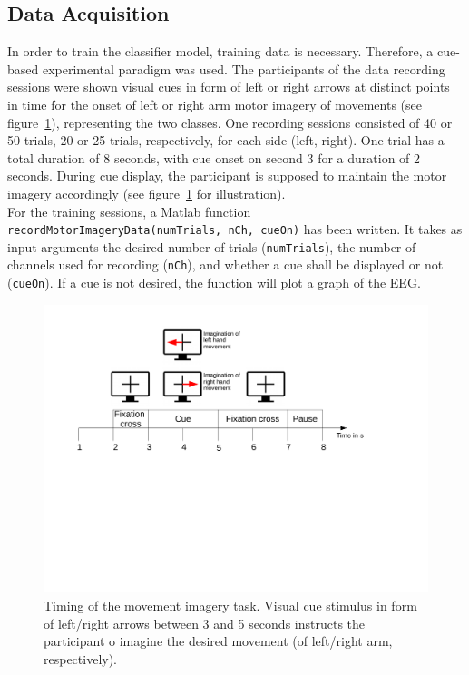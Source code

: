 \documentclass[a4paper,twoside, openright,12pt]{report}
\begin{document}
\subsection{Data Acquisition}
In order to train the classifier model, training data is necessary. Therefore, a cue-based experimental paradigm was used. The participants of the data recording sessions were shown visual cues in form of left or right arrows at distinct points in time for the onset of left or right arm motor imagery of movements (see figure~\ref{fig:exp_design}), representing the two classes. One recording sessions consisted of 40 or 50 trials, 20 or 25 trials, respectively, for each side (left, right). One trial has a total duration of 8 seconds, with cue onset on second 3 for a duration of 2 seconds. During cue display, the participant is supposed to maintain the motor imagery accordingly (see figure~\ref{fig:exp_design} for illustration).\\
For the training sessions, a Matlab function \texttt{recordMotorImageryData(numTrials, nCh, cueOn)} has been written. It takes as input arguments the desired number of trials (\texttt{numTrials}), the number of channels used for recording (\texttt{nCh}), and whether a cue shall be displayed or not (\texttt{cueOn}). If a cue is not desired, the function will plot a graph of the EEG. 
\begin{figure}[htbp!]
	\centering
	\includegraphics[width=1\linewidth]{./gfx/exp_design}
	\caption{Timing of the movement imagery task. Visual cue stimulus in form of left/right arrows between 3 and 5 seconds instructs the participant o imagine the desired movement (of left/right arm, respectively).}
	\label{fig:exp_design}
\end{figure}
\end{document}
